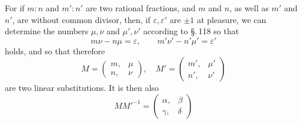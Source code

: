For if $m:n$ and $m':n'$ are two rational fractions, and $m$ and $n$, as well as $m'$ and $n'$, are without common divisor, then, if $\varepsilon, \varepsilon'$ are $\pm 1$ at pleasure, we can determine the numbers $\mu, \nu$ and $\mu', \nu'$ according to \S.\,118 so that
\[
m\nu - n\mu = \varepsilon, \qquad m'\nu' - n'\mu' = \varepsilon'
\]
holds, and so that therefore
\[
M = \begin{pmatrix}m, & \mu\\ n, & \nu\end{pmatrix}, \quad M' = \begin{pmatrix}m', & \mu'\\ n', & \nu'\end{pmatrix}
\]
are two linear substitutions. It is then also
\[
M M'^{-1} = \begin{pmatrix}\alpha, & \beta\\ \gamma, & \delta\end{pmatrix}
\]

